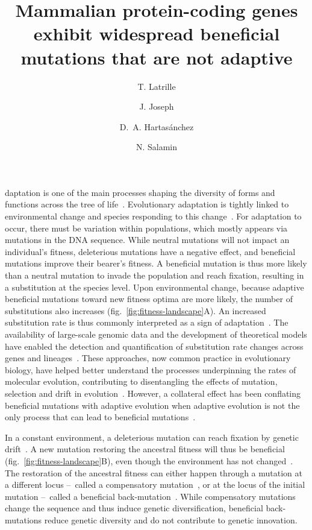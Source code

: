 \documentclass[9pt,twocolumn,twoside,lineno]{pnas-new}
\title{Mammalian protein-coding genes exhibit widespread beneficial mutations that are not adaptive}
\author[1]{T. {Latrille}}
\author[2]{J. {Joseph}}
\author[1]{D.~A. {Hartasánchez}}
\author[1]{N. {Salamin}}
\affil[1]{Department of Computational Biology, Université de Lausanne, Lausanne, Switzerland}
\affil[2]{Laboratoire de Biométrie et Biologie Evolutive, UMR5558, Université Lyon 1, Villeurbanne, France}
\begin{document}
\maketitle
\thispagestyle{firststyle}

daptation is one of the main processes shaping the diversity of forms and functions across the tree of life~\cite{darwin_origin_1859}.
Evolutionary adaptation is tightly linked to environmental change and species responding to this change~\cite{merrell_adaptive_1994, gavrilets_adaptive_2009}.
For adaptation to occur, there must be variation within populations, which mostly appears via mutations in the DNA sequence.
While neutral mutations will not impact an individual's fitness, deleterious mutations have a negative effect, and beneficial mutations improve their bearer's fitness.
A beneficial mutation is thus more likely than a neutral mutation to invade the population and reach fixation, resulting in a substitution at the species level.
Upon environmental change, because adaptive beneficial mutations toward new fitness optima are more likely, the number of substitutions also increases (fig.~\ref{fig:fitness-landscape}A).
An increased substitution rate is thus commonly interpreted as a sign of adaptation~\cite{mcdonald_adaptative_1991, smith_adaptive_2002, welch_estimating_2006}.
The availability of large-scale genomic data and the development of theoretical models have enabled the detection and quantification of substitution rate changes across genes and lineages~\cite{yang_statistical_2000, eyre-walker_genomic_2006, moutinho_variation_2019}.
These approaches, now common practice in evolutionary biology, have helped better understand the processes underpinning the rates of molecular evolution, contributing to disentangling the effects of mutation, selection and drift in evolution~\cite{lynch_mutation_2023}.
However, a collateral effect has been conflating beneficial mutations with adaptive evolution when adaptive evolution is not the only process that can lead to beneficial mutations~\cite{charlesworth_other_2007, mustonen_fitness_2009, jones_shifting_2017}.

In a constant environment, a deleterious mutation can reach fixation by genetic drift~\cite{Ohta1992}.
A new mutation restoring the ancestral fitness will thus be beneficial (fig.~\ref{fig:fitness-landscape}B), even though the environment has not changed~\cite{gillespie_ohta_1995, hartl_compensatory_1996, sella_application_2005, mustonen_fitness_2009, cvijovic_fate_2015}.
The restoration of the ancestral fitness can either happen through a mutation at a different locus –~called a compensatory mutation~\cite{hartl_compensatory_1996, mustonen_fitness_2009}, or at the locus of the initial mutation –~called a beneficial back-mutation~\cite{piganeau_estimating_2003, charlesworth_other_2007}.
While compensatory mutations change the sequence and thus induce genetic diversification, beneficial back-mutations reduce genetic diversity and do not contribute to genetic innovation.
\end{document}
